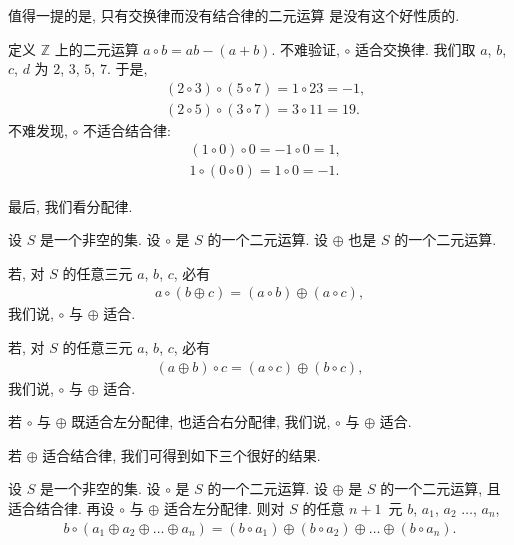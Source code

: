 \documentclass[%
    UTF8,%
    fontset=none,%
    punct=kaiming,%
    zihao=-4,%
    a4paper,%
    oneside,%
]{ctexbook}
\let\emph\relax
\begin{document}
值得一提的是, 只有交换律而没有结合律的二元运算%
是没有这个好性质的.

\begin{example}
    定义 \(\mathbb{Z}\) 上的二元运算
    \(a \circ b = ab - (a + b)\).
    不难验证, \(\circ\) 适合交换律.
    我们取 \(a\), \(b\), \(c\), \(d\)
    为 \(2\), \(3\), \(5\), \(7\).
    于是,
    \begin{align*}
         & (2 \circ 3) \circ (5 \circ 7) = 1 \circ 23 = -1, \\
         & (2 \circ 5) \circ (3 \circ 7) = 3 \circ 11 = 19.
    \end{align*}
    不难发现, \(\circ\) 不适合结合律:
    \begin{align*}
         & (1 \circ 0) \circ 0 = -1 \circ 0 = 1, \\
         & 1 \circ (0 \circ 0) = 1 \circ 0 = -1.
    \end{align*}
\end{example}

最后, 我们看分配律.

\begin{definition}
    设 \(S\) 是一个非空的集.
    设 \(\circ\) 是 \(S\) 的一个二元运算.
    设 \(\oplus\) 也是 \(S\) 的一个二元运算.

    若, 对 \(S\) 的任意三元 \(a\), \(b\), \(c\),
    必有
    \begin{align*}
        a \circ (b \oplus c)
        = (a \circ b) \oplus (a \circ c),
    \end{align*}
    我们说, \(\circ\) 与 \(\oplus\) 适合\emph{左分配律}.

    若, 对 \(S\) 的任意三元 \(a\), \(b\), \(c\),
    必有
    \begin{align*}
        (a \oplus b) \circ c
        = (a \circ c) \oplus (b \circ c),
    \end{align*}
    我们说, \(\circ\) 与 \(\oplus\) 适合\emph{右分配律}.

    若 \(\circ\) 与 \(\oplus\)
    既适合左分配律, 也适合右分配律,
    我们说,
    \(\circ\) 与 \(\oplus\) 适合\emph{分配律}.
\end{definition}

若 \(\oplus\) 适合结合律,
我们可得到如下三个很好的结果.

\begin{theorem}
    设 \(S\) 是一个非空的集.
    设 \(\circ\) 是 \(S\) 的一个二元运算.
    设 \(\oplus\) 是 \(S\) 的一个二元运算,
    且适合结合律.
    再设 \(\circ\) 与 \(\oplus\) 适合左分配律.
    则对 \(S\) 的任意 \(n + 1\)~元
    \(b\), \(a_1\), \(a_2\) \(\dots\), \(a_n\),
    \begin{align*}
        b \circ (a_1 \oplus a_2 \oplus \dots \oplus a_n)
        =
        (b \circ a_1) \oplus (b \circ a_2) \oplus
        \dots \oplus (b \circ a_n).
    \end{align*}
\end{theorem}
\end{document}
